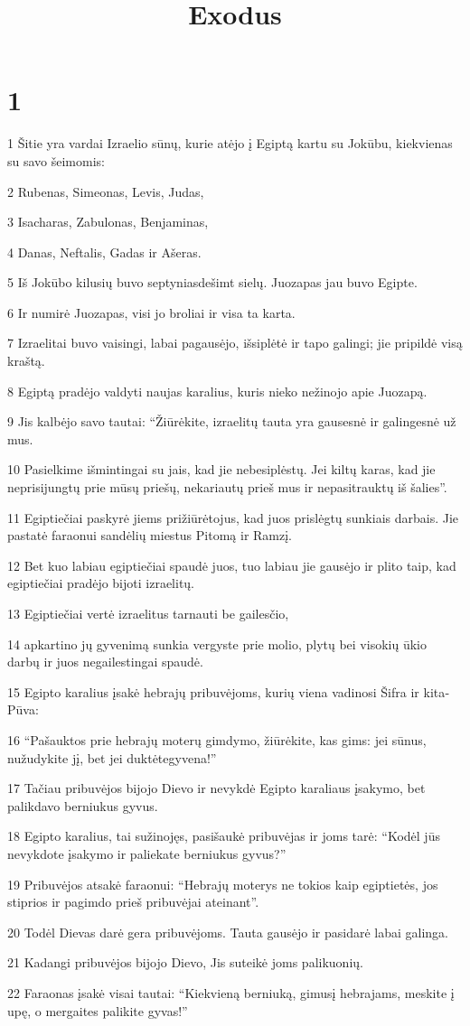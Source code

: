 

\title{Exodus}


\chapter{1}


\par 1 Šitie yra vardai Izraelio sūnų, kurie atėjo į Egiptą kartu su Jokūbu, kiekvienas su savo šeimomis: 
\par 2 Rubenas, Simeonas, Levis, Judas, 
\par 3 Isacharas, Zabulonas, Benjaminas, 
\par 4 Danas, Neftalis, Gadas ir Ašeras. 
\par 5 Iš Jokūbo kilusių buvo septyniasdešimt sielų. Juozapas jau buvo Egipte. 
\par 6 Ir numirė Juozapas, visi jo broliai ir visa ta karta. 
\par 7 Izraelitai buvo vaisingi, labai pagausėjo, išsiplėtė ir tapo galingi; jie pripildė visą kraštą. 
\par 8 Egiptą pradėjo valdyti naujas karalius, kuris nieko nežinojo apie Juozapą. 
\par 9 Jis kalbėjo savo tautai: “Žiūrėkite, izraelitų tauta yra gausesnė ir galingesnė už mus. 
\par 10 Pasielkime išmintingai su jais, kad jie nebesiplėstų. Jei kiltų karas, kad jie neprisijungtų prie mūsų priešų, nekariautų prieš mus ir nepasitrauktų iš šalies”. 
\par 11 Egiptiečiai paskyrė jiems prižiūrėtojus, kad juos prislėgtų sunkiais darbais. Jie pastatė faraonui sandėlių miestus Pitomą ir Ramzį. 
\par 12 Bet kuo labiau egiptiečiai spaudė juos, tuo labiau jie gausėjo ir plito taip, kad egiptiečiai pradėjo bijoti izraelitų. 
\par 13 Egiptiečiai vertė izraelitus tarnauti be gailesčio, 
\par 14 apkartino jų gyvenimą sunkia vergyste prie molio, plytų bei visokių ūkio darbų ir juos negailestingai spaudė. 
\par 15 Egipto karalius įsakė hebrajų pribuvėjoms, kurių viena vadinosi Šifra ir kita­Pūva: 
\par 16 “Pašauktos prie hebrajų moterų gimdymo, žiūrėkite, kas gims: jei sūnus, nužudykite jį, bet jei duktė­tegyvena!” 
\par 17 Tačiau pribuvėjos bijojo Dievo ir nevykdė Egipto karaliaus įsakymo, bet palikdavo berniukus gyvus. 
\par 18 Egipto karalius, tai sužinojęs, pasišaukė pribuvėjas ir joms tarė: “Kodėl jūs nevykdote įsakymo ir paliekate berniukus gyvus?” 
\par 19 Pribuvėjos atsakė faraonui: “Hebrajų moterys ne tokios kaip egiptietės, jos stiprios ir pagimdo prieš pribuvėjai ateinant”. 
\par 20 Todėl Dievas darė gera pribuvėjoms. Tauta gausėjo ir pasidarė labai galinga. 
\par 21 Kadangi pribuvėjos bijojo Dievo, Jis suteikė joms palikuonių. 
\par 22 Faraonas įsakė visai tautai: “Kiekvieną berniuką, gimusį hebrajams, meskite į upę, o mergaites palikite gyvas!”


